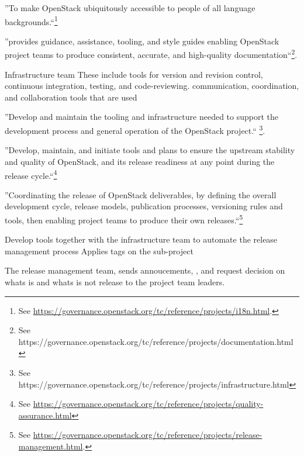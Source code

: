 \documentclass[dvipsnames]{interact}
\theoremstyle{plain}\newtheorem{theorem}{Theorem}[section]
\theoremstyle{definition}
\theoremstyle{remark}
\newenvironment{newStuff}{
    \begin{color}{Sepia}
    \begin{tabular}{|p{1.0\textwidth}|}
    \hline\\
    }
    { 
    \\\\\hline
    \end{tabular} 
    \end{color}
    }
\renewenvironment{newStuff}{}{}
\begin{document}
\begin{newStuff}

''To make OpenStack ubiquitously accessible to people of all language backgrounds.``\footnote{See \url{https://governance.openstack.org/tc/reference/projects/i18n.html}.}


''provides guidance, assistance, tooling, and style guides enabling OpenStack project teams to produce consistent, accurate, and high-quality documentation``\footnote{See https://governance.openstack.org/tc/reference/projects/documentation.html}.




Infrastructure team 
These include tools for version and revision control, continuous integration, testing, and code-reviewing. 
communication, coordination, and collaboration tools that are used 

''Develop and maintain the tooling and infrastructure needed to support the development process and general operation of the OpenStack project.`` \footnote{See https://governance.openstack.org/tc/reference/projects/infrastructure.html}.




''Develop, maintain, and initiate tools and plans to ensure the upstream stability and quality of OpenStack, and its release readiness at any point during the release cycle.``\footnote{See \url{https://governance.openstack.org/tc/reference/projects/quality-assurance.html}}






''Coordinating the release of OpenStack deliverables, by defining the overall development cycle, release models, publication processes, versioning rules and tools, then enabling project teams to produce their own releases.``\footnote{See \url{https://governance.openstack.org/tc/reference/projects/release-management.html}.}




Develop tools together with the infrastructure team to automate the release management process
Applies tags on the sub-project  

The release management team, sends annoucements, \citep{PooCaamanoKnauss_et_al2017}, and request decision on whats is and whats is not release to the project team leaders. 


\end{newStuff}
\end{document}
